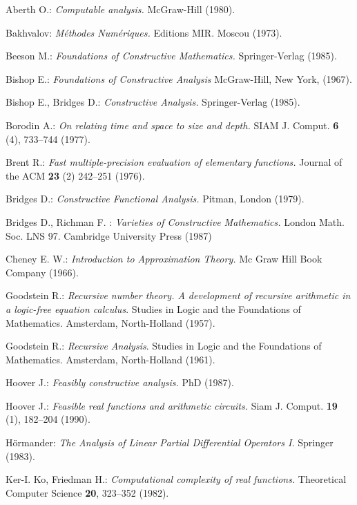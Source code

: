 \begin{thebibliography}{50}
 Aberth O.: {\em Computable analysis.}
McGraw-Hill (1980).

 Bakhvalov: {\em Méthodes Numériques.} Editions MIR. Moscou 
(1973).

 Beeson M.: {\em Foundations of Constructive Mathematics.} Springer-Verlag (1985).

 Bishop E.: {\em Foundations of Constructive Analysis}  McGraw-Hill, New York, (1967).

 Bishop E., Bridges D.: {\em Constructive Analysis.} Springer-Verlag (1985).

 Borodin A.: {\em On relating time and space to size and depth.} SIAM J. Comput. {\bf 6} (4), 733--744 (1977).

 Brent R.: {\em Fast multiple-precision evaluation of elementary functions.} Journal of the ACM {\bf 23} (2) 242--251 (1976).

 Bridges D.: {\em Constructive Functional Analysis.} Pitman, London (1979).

 Bridges D., Richman F. : {\em Varieties of Constructive 
Mathematics.} London Math. Soc. LNS 97. Cambridge University Press (1987)

 Cheney E. W.: {\em Introduction to Approximation Theory.}
 Mc Graw Hill Book Company (1966).

 Goodstein R.: {\em Recursive number theory. A development of recursive arithmetic in a logic-free equation calculus}. Studies in Logic and the Foundations of Mathematics. Amsterdam, North-Holland  (1957).

 Goodstein R.: {\em Recursive Analysis}. Studies in Logic and the Foundations of Mathematics. Amsterdam, North-Holland  (1961).

 Hoover J.: {\em Feasibly constructive analysis.} PhD (1987).

 Hoover J.: {\em Feasible real functions and arithmetic circuits.}
Siam J. Comput. {\bf 19} (1), 182--204 (1990).

 Hörmander: {\em The Analysis of Linear Partial Differential Operators I.} Springer (1983).

 Ker-I. Ko, Friedman H.: {\em Computational complexity of real functions.}
 Theoretical Computer Science {\bf 20}, 323--352 (1982).


\end{thebibliography}
